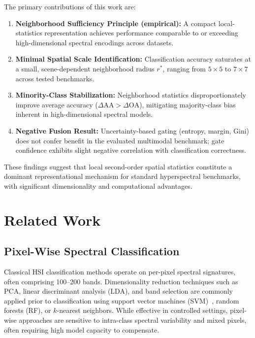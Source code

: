 \documentclass[journal]{IEEEtran}
\newcommand{\rstar}{r^{*}}
\newcommand{\OA}{\ensuremath{\mathrm{OA}}}
\newcommand{\Acc}{\ensuremath{\mathrm{AA}}}  %
\begin{document}
The primary contributions of this work are:
\begin{enumerate}
  \item \textbf{Neighborhood Sufficiency Principle (empirical):} A
    compact local-statistics representation achieves performance
    comparable to or exceeding high-dimensional spectral encodings
    across datasets.
  \item \textbf{Minimal Spatial Scale Identification:} Classification
    accuracy saturates at a small, scene-dependent neighborhood
    radius $\rstar$, ranging from $5{\times}5$ to $7{\times}7$ across
    tested benchmarks.
  \item \textbf{Minority-Class Stabilization:} Neighborhood statistics
    disproportionately improve average accuracy ($\Delta\Acc >
    \Delta\OA$), mitigating majority-class bias inherent in
    high-dimensional spectral models.
  \item \textbf{Negative Fusion Result:} Uncertainty-based gating
    (entropy, margin, Gini) does not confer benefit in the evaluated
    multimodal benchmark; gate confidence exhibits slight negative
    correlation with classification correctness.
\end{enumerate}

These findings suggest that local second-order spatial statistics
constitute a dominant representational mechanism for standard
hyperspectral benchmarks, with significant dimensionality and
computational advantages.

\section{Related Work}
\label{sec:related}

\subsection{Pixel-Wise Spectral Classification}

Classical HSI classification methods operate on per-pixel spectral
signatures, often comprising 100--200 bands. Dimensionality reduction
techniques such as PCA, linear discriminant analysis (LDA), and band
selection are commonly applied prior to classification using support
vector machines (SVM)~\cite{campsvalls2005_kernel_hsi}, random forests (RF), or
$k$-nearest neighbors. While effective in controlled settings,
pixel-wise approaches are sensitive to intra-class spectral
variability and mixed pixels, often requiring high model capacity to
compensate.
\end{document}
